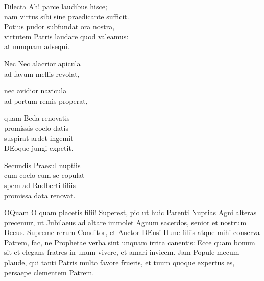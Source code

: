 \documentclass[tocstyle=ref-genre]{ees}
\begin{document}
{\begin{movement}{Dilecta}
  Ah! parce laudibus hisce;\\
  nam virtus sibi sine praedicante sufficit.\\
  Potius pudor subfundat ora nostra,\\
  virtutem Patris laudare quod valeamus:\\
  at nunquam adsequi.
\end{movement}

\begin{movement}{Nec}
  Nec alacrior apicula\\
  ad favum mellis revolat,

  nec avidior navicula\\
  ad portum remis properat,

  \voice[both]
  quam Beda renovatis\\
  promissis coelo datis\\
  suspirat ardet ingemit\\
  DEoque jungi expetit.

  Secundis Praesul nuptiis\\
  cum coelo cum se copulat\\
  spem ad Rudberti filiis\\
  promissa data renovat.
\end{movement}

\begin{movement}{OQuam}
  O quam placetis filii!
  Superest, pio ut huic Parenti Nuptias
  Agni alteras precemur,
  ut Jubilaeus ad altare
  immolet Agnum sacerdos,
  senior et nostrum Decus.
  Supreme rerum Conditor, et Auctor DEus!
  Hunc filiis atque mihi conserva Patrem,
  fac, ne Prophetae verba sint
  unquam irrita canentis:
  Ecce quam bonum sit et elegans
  fratres in unum vivere,
  et amari invicem.
  Jam Popule mecum plaude,
  qui tanti Patris multo favore frueris,
  et tuum quoque expertus es,
  persaepe clementem Patrem.
\end{movement}

}

\eesScore
\end{document}
